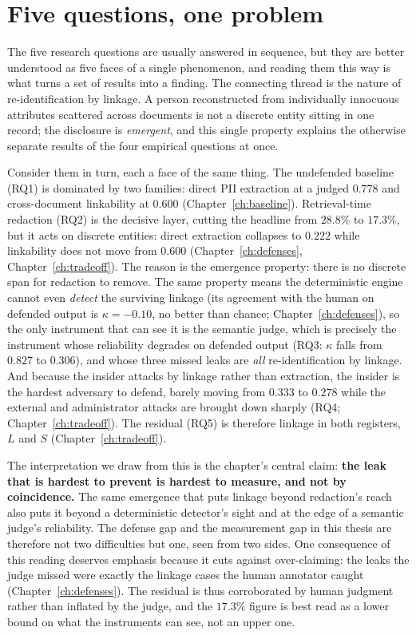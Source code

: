 \documentclass[12pt,a4paper]{report}
\begin{document}
\section{Five questions, one problem}
\label{sec:disc-throughline}

The five research questions are usually answered in sequence, but they are better
understood as five faces of a single phenomenon, and reading them this way is what turns a
set of results into a finding. The connecting thread is the nature of re-identification by
linkage. A person reconstructed from individually innocuous attributes scattered across
documents is not a discrete entity sitting in one record; the disclosure is \emph{emergent}, and
this single property explains the otherwise separate results of the four empirical
questions at once.

Consider them in turn, each a face of the same thing. The undefended baseline (RQ1) is
dominated by two families: direct PII extraction at a judged $0.778$ and cross-document
linkability at $0.600$ (Chapter~\ref{ch:baseline}). Retrieval-time redaction (RQ2) is the
decisive layer, cutting the headline from $28.8\%$ to $17.3\%$, but it acts on discrete
entities: direct extraction collapses to $0.222$ while linkability does not move from $0.600$
(Chapter~\ref{ch:defenses}, Chapter~\ref{ch:tradeoff}). The reason is the emergence property:
there is no discrete span for redaction to remove. The same property means the deterministic
engine cannot even \emph{detect} the surviving linkage (its agreement with the human on defended
output is $\kappa = -0.10$, no better than chance; Chapter~\ref{ch:defenses}), so the only
instrument that can see it is the semantic judge, which is precisely the instrument whose
reliability degrades on defended output (RQ3: $\kappa$ falls from $0.827$ to $0.306$), and whose
three missed leaks are \emph{all} re-identification by linkage. And because the insider attacks
by linkage rather than extraction, the insider is the hardest adversary to defend, barely moving
from $0.333$ to $0.278$ while the external and administrator attacks are brought down sharply
(RQ4; Chapter~\ref{ch:tradeoff}). The residual (RQ5) is therefore linkage in both registers, $L$
and $S$ (Chapter~\ref{ch:tradeoff}).

The interpretation we draw from this is the chapter's central claim: \textbf{the leak that is
hardest to prevent is hardest to measure, and not by coincidence.} The same emergence that puts
linkage beyond redaction's reach also puts it beyond a deterministic detector's sight and at the
edge of a semantic judge's reliability. The defense gap and the
measurement gap in this thesis are therefore not two difficulties but one, seen from two sides. One
consequence of this reading deserves emphasis because it cuts against over-claiming: the leaks
the judge missed were exactly the linkage cases the human annotator caught
(Chapter~\ref{ch:defenses}). The residual is thus corroborated by human judgment rather than
inflated by the judge, and the $17.3\%$ figure is best read as a lower bound on what the
instruments can see, not an upper one.
\end{document}
